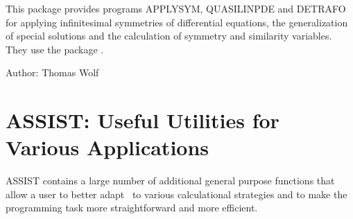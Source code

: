 This package provides programs APPLYSYM, QUASILINPDE and DETRAFO for
applying infinitesimal symmetries of differential equations, the
generalization of special solutions and the calculation of symmetry
and similarity variables.  They use the package
\hyperref[package:CRACK]{}.

Author: Thomas Wolf

\newpage

\section{ASSIST: Useful Utilities for Various Applications}
\label{ASSIST}\hypertarget{ASSIST}{}

ASSIST contains a large number of additional general purpose functions
that allow a user to better adapt \REDUCE\ to various calculational
strategies and to make the programming task more straightforward and more
efficient.

